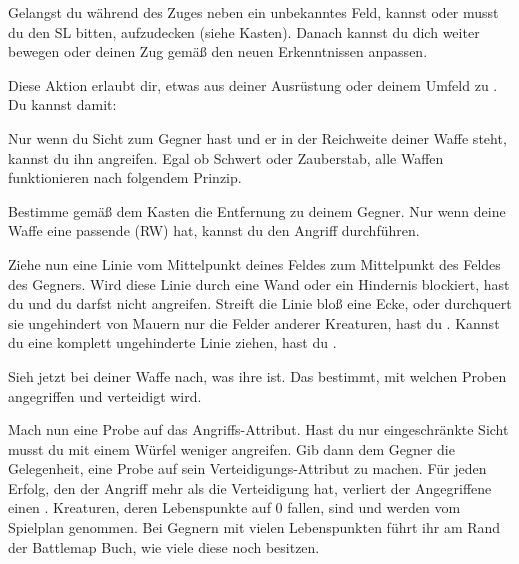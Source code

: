 {			Gelangst du während des Zuges neben ein unbekanntes Feld, kannst oder musst du den SL bitten, aufzudecken (siehe Kasten). Danach kannst du dich weiter bewegen oder deinen Zug gemäß den neuen Erkenntnissen anpassen.

			Diese Aktion erlaubt dir, etwas aus deiner Ausrüstung oder deinem Umfeld zu . Du kannst damit:


			Nur wenn du Sicht zum Gegner hast und er in der Reichweite deiner Waffe steht, kannst du ihn angreifen. Egal ob Schwert oder Zauberstab, alle Waffen funktionieren nach folgendem Prinzip.

			Bestimme gemäß dem Kasten  die Entfernung zu deinem Gegner. Nur wenn deine Waffe eine passende  (RW) hat, kannst du den Angriff durchführen.

			Ziehe nun eine Linie vom Mittelpunkt deines Feldes zum Mittelpunkt des Feldes des Gegners. Wird diese Linie durch eine Wand oder ein Hindernis blockiert, hast du  und du darfst nicht angreifen. Streift die Linie bloß eine Ecke, oder durchquert sie ungehindert von Mauern nur die Felder anderer Kreaturen, hast du . Kannst du eine komplett ungehinderte Linie ziehen, hast du .

			Sieh jetzt bei deiner Waffe nach, was ihre  ist. Das bestimmt, mit welchen Proben angegriffen und verteidigt wird.


			Mach nun eine Probe auf das Angriffs-Attribut. Hast du nur eingeschränkte Sicht musst du mit einem Würfel weniger angreifen. Gib dann dem Gegner die Gelegenheit, eine Probe auf sein Verteidi\-gungs-Attribut zu machen. Für jeden Erfolg, den der Angriff mehr als die Verteidigung hat, verliert der Angegriffene einen . Kreaturen, deren Lebenspunkte auf 0 fallen, sind  und werden vom Spielplan genommen. Bei Gegnern mit vielen Lebenspunkten führt ihr am Rand der Battlemap Buch, wie viele diese noch besitzen.

}
